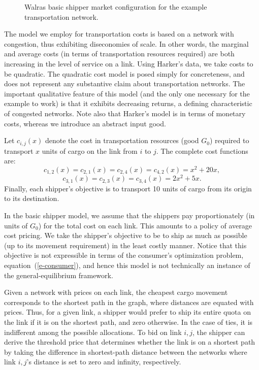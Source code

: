 \begin{figure}[htbp]
\centerline{}
\caption{{\sc Walras} basic shipper market configuration for the
example transportation network.}
\label{fig:config}
\end{figure}

The model we employ for transportation costs is based on a network with
congestion, thus exhibiting diseconomies of scale. In other words, the
marginal and average costs (in terms of transportation resources required)
are both increasing in the level of service on a link. 
Using Harker's data, we take costs to be quadratic.  The quadratic cost
model is posed simply for concreteness, and does not represent any substantive
claim about transportation networks.  The important qualitative feature of this 
model (and the only one necessary for the example to work) is that it exhibits
decreasing returns, a defining characteristic 
of congested networks.  Note also that Harker's model is in terms of 
monetary costs, whereas we introduce an abstract input good.

Let $c_{i,j}(x)$ denote the cost in transportation resources (good $G_0$) 
required to transport $x$ units of cargo on the link from $i$ to $j$.
The complete cost functions are:
\begin{displaymath}
c_{1,2}(x) = c_{2,1}(x) = c_{2,4}(x) = c_{4,2}(x) = x^2 + 20x,
\end{displaymath}
\begin{displaymath}
c_{3,1}(x) = c_{2,3}(x) = c_{3,4}(x) = 2x^2 + 5x.
\end{displaymath}
Finally, each shipper's objective is to transport 10 units 
of cargo from its origin to its destination.

In the basic shipper model, we assume that the shippers pay
proportionately (in units of $G_0$) for the total cost on each link.
This amounts to a policy of average cost pricing.
We take the shipper's objective
to be to ship as much as possible (up to its movement requirement) in the
least costly manner. 
Notice that this objective is not expressible in terms of the consumer's 
optimization problem, equation~(\ref{e-consumer}), and hence this model is not 
technically an instance of the general-equilibrium framework.

Given a network with prices on each link, the cheapest
cargo movement corresponds to the shortest path in the graph, where
distances are equated with prices. Thus, for a given link, a shipper would
prefer to ship its entire quota on the link if it is on the shortest path,
and zero otherwise. In the case of ties, it is indifferent among the
possible allocations. To bid on link $i,j$, the shipper can derive the
threshold price that determines whether the link is on a shortest path by taking the
difference in shortest-path distance between the networks where link 
$i,j$'s distance is set to zero and infinity, respectively.


